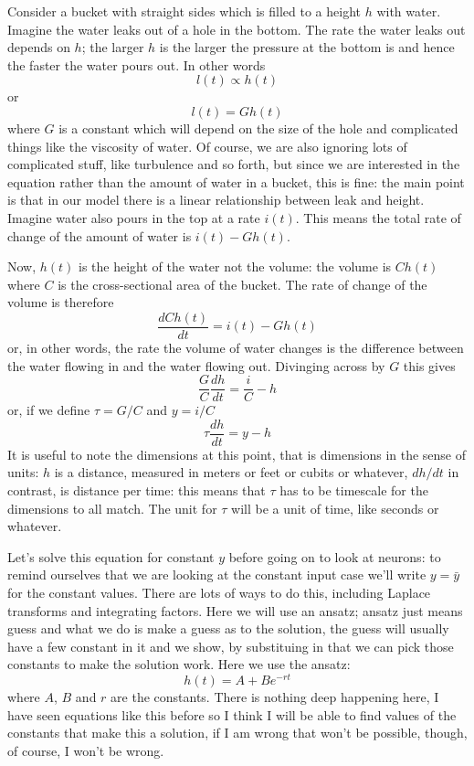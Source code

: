 \documentclass{article}
\begin{document}
Consider a bucket with straight sides which is filled to a height $h$
with water. Imagine the water leaks out of a hole in the bottom. The
rate the water leaks out depends on $h$; the larger $h$ is the larger
the pressure at the bottom is and hence the faster the water pours
out. In other words
\begin{equation}
l(t)\propto h(t)
\end{equation}
or 
\begin{equation}
l(t)= G h(t)
\end{equation}
where $G$ is a constant which will depend on the size of the hole and
complicated things like the viscosity of water. Of course, we are also
ignoring lots of complicated stuff, like turbulence and so forth, but
since we are interested in the equation rather than the amount of
water in a bucket, this is fine: the main point is that in our model
there is a linear relationship between leak and height. Imagine water
also pours in the top at a rate $i(t)$. This means the total rate of
change of the amount of water is $i(t)-Gh(t)$.

Now, $h(t)$ is the height of the water not the volume: the volume is
$Ch(t)$ where $C$ is the cross-sectional area of the bucket. The rate
of change of the volume is therefore
\begin{equation}
\frac{dCh(t)}{dt}=i(t)-Gh(t)
\end{equation}
or, in other words, the rate the volume of water changes is the difference between the water flowing in and the water flowing out. Divinging across by $G$ this gives
\begin{equation}
\frac{G}{C}\frac{dh}{dt}=\frac{i}{C}-h
\end{equation}
or, if we define $\tau=G/C$ and $y=i/C$
\begin{equation}
\tau\frac{dh}{dt}=y-h
\end{equation}
It is useful to note the dimensions at this point, that is dimensions
in the sense of units: $h$ is a distance, measured in meters or feet
or cubits or whatever, $dh/dt$ in contrast, is distance per time: this
means that $\tau$ has to be timescale for the dimensions to all match. The unit for $\tau$ will be a unit of time, like seconds or whatever.

Let's solve this equation for constant $y$ before going on to look at
neurons: to remind ourselves that we are looking at the constant input
case we'll write $y=\bar{y}$ for the constant values. There are lots
of ways to do this, including Laplace transforms and integrating
factors.  Here we will use an ansatz; ansatz just means guess and what
we do is make a guess as to the solution, the guess will usually have
a few constant in it and we show, by substituing in that we can pick
those constants to make the solution work. Here we use the ansatz:
\begin{equation}
  h(t) = A+ Be^{-rt}
\end{equation}
where $A$, $B$ and $r$ are the constants. There is nothing deep
happening here, I have seen equations like this before so I think I
will be able to find values of the constants that make this a
solution, if I am wrong that won't be possible, though, of course, I
won't be wrong.
\end{document}
